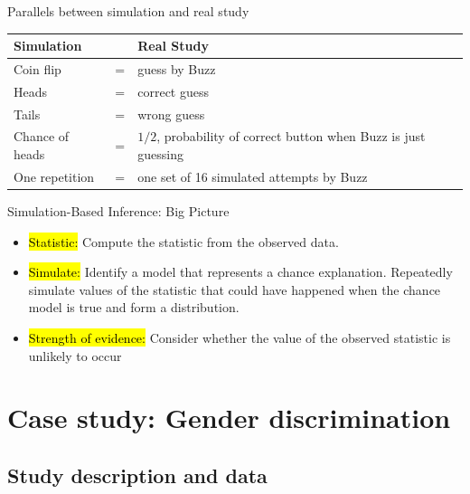 \documentclass[slidestop,compress,mathserif]{beamer}
\begin{document}
\begin{frame}{Parallels between simulation and real study}
\begin{table}
    \renewcommand{\arraystretch}{1.4} %
    \begin{tabular}{p{3.0cm} c p{6.0cm}}
        \rowcolor{blue!30!black!15} 
        \textbf{Simulation} & & \textbf{Real Study}\\
        \hline
        Coin flip         & = & guess by Buzz \\
        Heads             & = & correct guess \\
        Tails             & = & wrong guess \\
        Chance of heads   & = & $1/2$, probability of correct button when Buzz is just guessing \\
        One repetition    & = & one set of 16 simulated attempts by Buzz \\
    \end{tabular}
\end{table}
\end{frame}


\begin{frame}{Simulation-Based Inference: Big Picture}
    \begin{itemize}
        \item \hl{Statistic: }Compute the statistic from the observed data.
        \item \hl{Simulate: } Identify a model that represents a chance explanation. Repeatedly simulate 
        values of the statistic that could have happened when the chance model is true and form a distribution. 
        \item \hl{Strength of evidence: }Consider whether the value of the observed statistic is unlikely to occur
    \end{itemize}
\end{frame}


\section{Case study: Gender discrimination}


\subsection{Study description and data}
\end{document}
